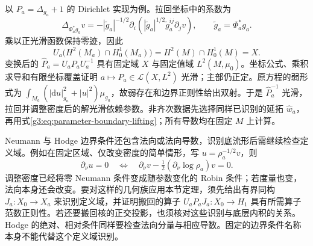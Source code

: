 \ProseParagraphBreak

以 \(P_a=\Delta_{g_a}+1\) 的 Dirichlet 实现为例。拉回坐标中的系数为
\[
	\Delta_{\Phi_a^*g_a}v
	=-|\widetilde g_a|^{-1/2}\partial_i
	\left(|\widetilde g_a|^{1/2}\widetilde g_a^{ij}\partial_jv\right),
	\qquad \widetilde g_a=\Phi_a^*g_a.
\]
乘以正光滑函数保持零迹，因此
\[
	U_a\bigl(H^2(M_a)\cap H^1_0(M_a)\bigr)
	=H^2(M)\cap H^1_0(M)=X.
\]
变换后的 \(\widehat P_a=U_aP_aU_a^{-1}\) 具有固定域 \(X\) 与固定值域 \(L^2(M,\mu_0)\)。坐标公式、乘积求导和有限坐标覆盖证明 \(a\mapsto\widehat P_a\in\mathcal L(X,L^2)\) 光滑；主部仍正定。原方程的弱形式为
\(\int_{M_a}(|\mathrm du|_{g_a}^2+|u|^2)\mu_{g_a}\)，故弱存在和边界正则性给出双射。于是 \(\widehat P_a^{-1}\) 光滑，拉回并调整密度后的解光滑依赖参数。非齐次数据先选择同样已识别的延拓 \(\widehat w_a\)，再用式\eqref{g3:eq:parameter-boundary-lifting}；所有导数均在固定 \(M\) 上计算。

\ProseParagraphBreak

Neumann 与 Hodge 边界条件还包含法向或法向导数，识别底流形后需继续检查定义域。例如在固定区域、仅改变密度的简单情形，写 \(u=\rho_a^{-1/2}v\)，则
\[
	\partial_\nu u=0
	\quad\Longleftrightarrow\quad
	\partial_\nu v-\tfrac12(\partial_\nu\log\rho_a)v=0.
\]
调整密度已经将零 Neumann 条件变成随参数变化的 Robin 条件；若度量也变，法向本身还会改变。要对这样的几何族应用本节定理，须先给出有界同构 \(J_a:X_0\to X_a\) 来识别定义域，并证明搬回的算子 \(U_aP_aJ_a:X_0\to H_1\) 具有所需算子范数正则性。若还要搬回核的正交投影，也须核对这些识别与底层内积的关系。Hodge 的绝对、相对条件同样要检查法向分量与相应导数。固定的边界条件名称本身不能代替这个定义域识别。

